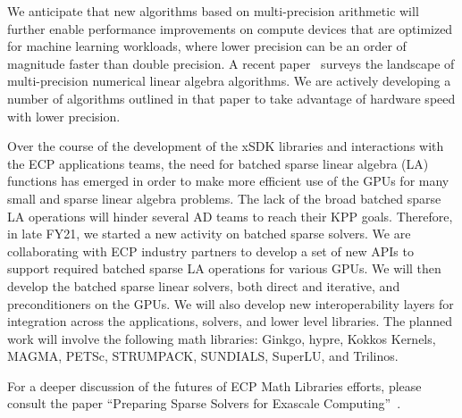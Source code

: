 We anticipate that new algorithms based on multi-precision arithmetic will further enable performance improvements on compute devices that are optimized for machine learning workloads,
where lower precision can be an order of magnitude faster than double precision.
A recent paper~\cite{Anztetal2020} surveys the landscape of multi-precision numerical
linear algebra algorithms. We are actively developing a number of algorithms outlined in that paper to take advantage of hardware speed with lower precision.

Over the course of the development of the xSDK libraries and interactions with the
ECP applications teams, the need for batched sparse linear algebra (LA) functions
has emerged in order to make more efficient use of the GPUs for many small and
sparse linear algebra problems. The lack of the broad batched sparse LA operations
will hinder several AD teams to reach their KPP goals. Therefore, in late FY21,
we started a new activity on batched sparse solvers.
We are collaborating with ECP industry partners to develop a set of new APIs to
support required batched sparse LA operations for various GPUs.
We will then develop the batched sparse linear solvers, both direct
and iterative, and preconditioners on the GPUs. We will also develop new
interoperability layers for integration across the applications, solvers, and lower
level libraries. The planned work will involve the following math libraries: Ginkgo,
hypre, Kokkos Kernels, MAGMA, PETSc, STRUMPACK, SUNDIALS, SuperLU, and Trilinos.

For a deeper discussion of the futures of ECP Math Libraries efforts, please consult the paper ``Preparing Sparse Solvers for Exascale Computing''~\cite{ECP-Solvers}.
